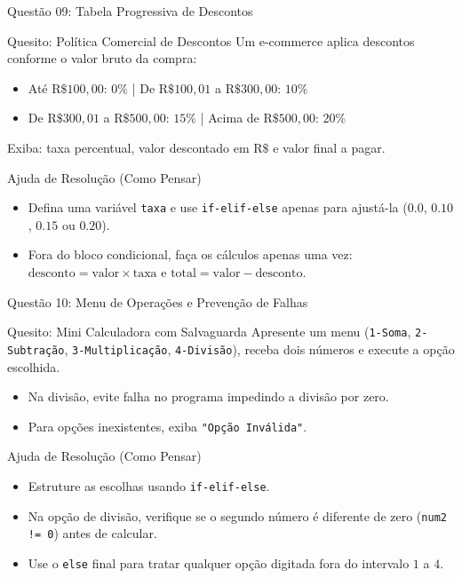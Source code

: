 \begin{frame}{Questão 09: Tabela Progressiva de Descontos}
    \begin{block}{Quesito: Política Comercial de Descontos}
        Um e-commerce aplica descontos conforme o valor bruto da compra:
        \begin{itemize}
            \item Até $\text{R\$ } 100{,}00$: $0\%$ | De $\text{R\$ } 100{,}01$ a $\text{R\$ } 300{,}00$: $10\%$
            \item De $\text{R\$ } 300{,}01$ a $\text{R\$ } 500{,}00$: $15\%$ | Acima de $\text{R\$ } 500{,}00$: $20\%$
        \end{itemize}
        Exiba: taxa percentual, valor descontado em $\text{R\$}$ e valor final a pagar.
    \end{block}

    \begin{exampleblock}{Ajuda de Resolução (Como Pensar)}
        \begin{itemize}
            \item Defina uma variável \texttt{taxa} e use \texttt{if-elif-else} apenas para ajustá-la ($0.0$, $0.10$, $0.15$ ou $0.20$).
            \item Fora do bloco condicional, faça os cálculos apenas uma vez: $\text{desconto} = \text{valor} \times \text{taxa}$ e $\text{total} = \text{valor} - \text{desconto}$.
        \end{itemize}
    \end{exampleblock}
\end{frame}

\begin{frame}{Questão 10: Menu de Operações e Prevenção de Falhas}
    \begin{block}{Quesito: Mini Calculadora com Salvaguarda}
        Apresente um menu (\texttt{1-Soma}, \texttt{2-Subtração}, \texttt{3-Multiplicação}, \texttt{4-Divisão}), receba dois números e execute a opção escolhida.
        \begin{itemize}
            \item Na divisão, evite falha no programa impedindo a divisão por zero.
            \item Para opções inexistentes, exiba \texttt{"Opção Inválida"}.
        \end{itemize}
    \end{block}

    \begin{exampleblock}{Ajuda de Resolução (Como Pensar)}
        \begin{itemize}
            \item Estruture as escolhas usando \texttt{if-elif-else}.
            \item Na opção de divisão, verifique se o segundo número é diferente de zero (\texttt{num2 != 0}) antes de calcular.
            \item Use o \texttt{else} final para tratar qualquer opção digitada fora do intervalo $1$ a $4$.
        \end{itemize}
    \end{exampleblock}
\end{frame}
